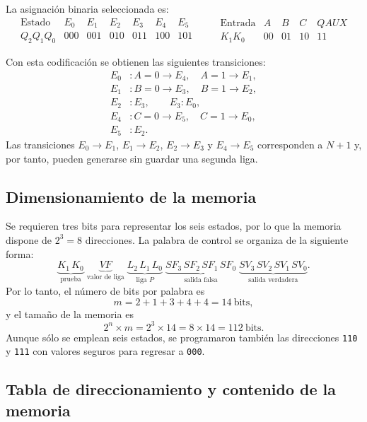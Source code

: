 \documentclass[letterpaper,12pt]{article}
\begin{document}
La asignación binaria seleccionada es:
\[
\begin{array}{c|cccccc}
\text{Estado} & E_0 & E_1 & E_2 & E_3 & E_4 & E_5\\ \hline
Q_2Q_1Q_0 & 000 & 001 & 010 & 011 & 100 & 101
\end{array}
\qquad
\begin{array}{c|cccc}
\text{Entrada} & A & B & C & QAUX\\ \hline
K_1K_0 & 00 & 01 & 10 & 11
\end{array}
\]

Con esta codificación se obtienen las siguientes transiciones:
\[
\begin{aligned}
E_0 &: A=0\rightarrow E_4,\quad A=1\rightarrow E_1,\\
E_1 &: B=0\rightarrow E_3,\quad B=1\rightarrow E_2,\\
E_2 &: E_3,\qquad
E_3 : E_0,\\
E_4 &: C=0\rightarrow E_5,\quad C=1\rightarrow E_0,\\
E_5 &: E_2.
\end{aligned}
\]
Las transiciones $E_0\rightarrow E_1$, $E_1\rightarrow E_2$, $E_2\rightarrow E_3$ y $E_4\rightarrow E_5$ corresponden a $N+1$ y, por tanto, pueden generarse sin guardar una segunda liga.

\subsection{Dimensionamiento de la memoria}

Se requieren tres bits para representar los seis estados, por lo que la memoria dispone de $2^3=8$ direcciones. La palabra de control se organiza de la siguiente forma:
\[
\underbrace{K_1\,K_0}_{\text{prueba}}
\;\underbrace{VF}_{\text{valor de liga}}
\;\underbrace{L_2\,L_1\,L_0}_{\text{liga }P}
\;\underbrace{SF_3\,SF_2\,SF_1\,SF_0}_{\text{salida falsa}}
\;\underbrace{SV_3\,SV_2\,SV_1\,SV_0}_{\text{salida verdadera}}.
\]
Por lo tanto, el número de bits por palabra es
\[
m=2+1+3+4+4=14\ \text{bits},
\]
y el tamaño de la memoria es
\[
2^n\times m=2^3\times14=8\times14=112\ \text{bits}.
\]
Aunque sólo se emplean seis estados, se programaron también las direcciones \texttt{110} y \texttt{111} con valores seguros para regresar a \texttt{000}.

\subsection{Tabla de direccionamiento y contenido de la memoria}
\end{document}
